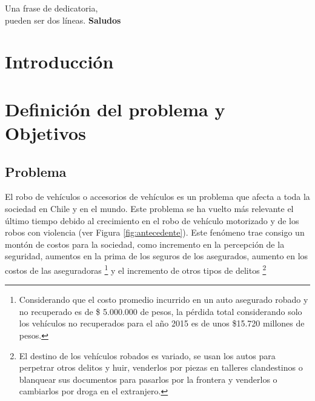 \documentclass[letterpaper,12pt,oneside]{book} %
\begin{document}



\newcommand{\quotes}[1]{``#1''}

\begin{dedicatoria}
	Una frase de dedicatoria, \\
	pueden ser dos líneas. \newp
	\textbf{Saludos}
\end{dedicatoria}

\begin{agradecimientos}
	\lipsum[1]
\end{agradecimientos}



\begin{resumen}
	\lipsum[1]
\end{resumen}


\hypersetup{
    citecolor=Blue
}
\chapter{Introducción}

\chapter{Definición del problema y Objetivos}
\section{Problema}
El robo de vehículos o accesorios de vehículos es un problema que afecta a toda la sociedad en Chile y en el mundo. Este problema se ha vuelto más relevante el último tiempo debido al crecimiento en el robo de vehículo motorizado y de los robos con violencia (ver Figura \ref{fig:antecedente}). Este fenómeno trae consigo un montón de costos para la sociedad, como incremento en la percepción de la seguridad, aumentos en la prima de los seguros de los asegurados, aumento en los costos de las aseguradoras \footnote{Considerando que el costo promedio incurrido en un auto asegurado robado y no recuperado es de \$ 5.000.000 de pesos, la pérdida total considerando solo los vehículos no recuperados para el año 2015 es de unos \$15.720 millones de pesos.} y el incremento de otros tipos de delitos \footnote{El destino de los vehículos robados es variado, se usan los autos para perpetrar otros delitos y huir, venderlos por piezas en talleres clandestinos o blanquear sus documentos para pasarlos por la frontera y venderlos o cambiarlos por droga en el extranjero.} 
\end{document}
